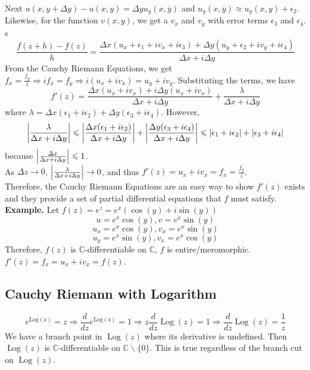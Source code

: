\documentclass[11pt]{article}
\DeclarePairedDelimiter\abs{\lvert}{\rvert}
\begin{document}
Next $u(x, y + \Delta y) - u(x, y) = \Delta y u_y(x, \overline y)$ and $u_y(x, \overline y) \approx u_y(x, y) + \epsilon_2$. \\
Likewise, for the function $v(x, y)$, we get a $v_x$ and $v_y$ with error terms $\epsilon_3$ and $\epsilon_4$. s
$$\frac{f(z + h) - f(z)}{h} = \frac{\Delta x(u_x + \epsilon_1 + iv_x + i\epsilon_3) + \Delta y(u_y + \epsilon_2 + iv_y + i\epsilon_4)}{\Delta x + i \Delta y}$$
From the Cauchy Riemann Equations, we get $f_x = \frac{f_y}{i} \Rightarrow if_x = f_y \Rightarrow i(u_x + iv_x) = u_y + iv_y$. Substituting the terms, we have 
$$f'(z) = \frac{\Delta x(u_x + iv_x) + i \Delta y(u_x + iv_x)}{\Delta x + i \Delta y} + \frac{\lambda}{\Delta x + i\Delta y}$$
where $\lambda = \Delta x(\epsilon_1 + i\epsilon_2) + \Delta y(\epsilon_3 + i\epsilon_4)$. However, \\
$$\abs*{\frac{\lambda}{\Delta x+ i \Delta y}} \leqslant \abs*{\frac{\Delta x(\epsilon_1 + i\epsilon_2)}{\Delta x + i\Delta y}} + \abs*{\frac{\Delta y(\epsilon_3 + i\epsilon_4)}{\Delta x + i \Delta y}} \leqslant |\epsilon_1 + i\epsilon_2| + |\epsilon_3 + i\epsilon_4|$$ 
because $\abs*{\frac{\Delta x}{\Delta x + i\Delta y}} \leqslant 1$. \\
As $\Delta z \to 0$, $\abs*{\frac{\lambda}{\Delta x+ i \Delta y}} \to 0$, and thus $f'(z) = u_x + iv_x = f_x = \frac{f_y}{i}$. \\
Therefore, the Cauchy Riemann Equations are an easy way to show $f'(z)$ exists and they provide a set of partial differential equations that $f$ must satisfy. \\
\newline
\textbf{Example.} Let $f(z) = e^z = e^x(\cos(y) + i\sin(y))$ 
$$u = e^x\cos(y), v = e^x\sin(y)$$ 
$$u_x = e^x\cos(y), v_x = e^x\sin(y)$$
$$u_y = e^x\sin(y), v_x = e^x\cos(y)$$
Therefore, $f(z)$ is $\mathbb{C}$-differentiable on $\mathbb{C}$, $f$ is entire/meromorphic. $f'(z) = f_x = u_x + iv_x = f(z)$.

\subsection{Cauchy Riemann with Logarithm}
$$e^{\operatorname{Log(z)}} = z \Rightarrow \frac{d}{dz}e^{\operatorname{Log(z)}} = 1 \Rightarrow z\frac{d}{dz}\operatorname{Log}(z) = 1 \Rightarrow \frac{d}{dz}\operatorname{Log}(z) = \frac{1}{z}$$
We have a branch point in $\operatorname{Log}(z)$ where its derivative is undefined. Then $\operatorname{Log}(z)$ is $\mathbb{C}$-differentiable on $\mathbb{C} \backslash \{0\}$. This is true regardless of the branch cut on $\operatorname{Log}(z)$. 
\end{document}
